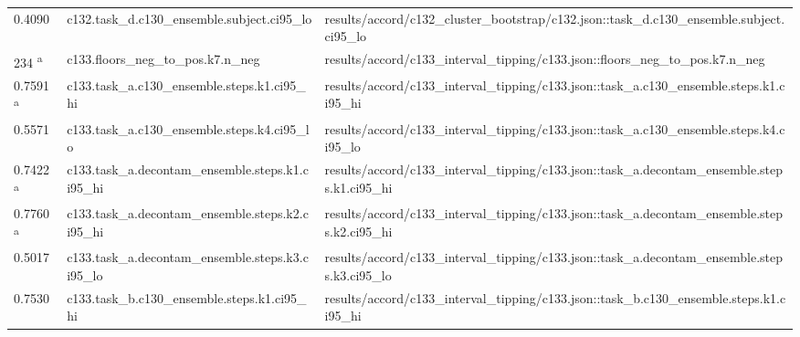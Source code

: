 \begin{longtable}{@{}p{0.7in}p{1.9in}p{2.6in}@{}}
0.4090 & c132.\allowbreak{}task\_d.\allowbreak{}c130\_ensemble.\allowbreak{}subject.\allowbreak{}ci95\_lo & results/\allowbreak{}accord/\allowbreak{}c132\_cluster\_bootstrap/\allowbreak{}c132.\allowbreak{}json::task\_d.\allowbreak{}c130\_ensemble.\allowbreak{}subject.\allowbreak{}ci95\_lo\\
234 \textsuperscript{a} & c133.\allowbreak{}floors\_neg\_to\_pos.\allowbreak{}k7.\allowbreak{}n\_neg & results/\allowbreak{}accord/\allowbreak{}c133\_interval\_tipping/\allowbreak{}c133.\allowbreak{}json::floors\_neg\_to\_pos.\allowbreak{}k7.\allowbreak{}n\_neg\\
0.7591 \textsuperscript{a} & c133.\allowbreak{}task\_a.\allowbreak{}c130\_ensemble.\allowbreak{}steps.\allowbreak{}k1.\allowbreak{}ci95\_hi & results/\allowbreak{}accord/\allowbreak{}c133\_interval\_tipping/\allowbreak{}c133.\allowbreak{}json::task\_a.\allowbreak{}c130\_ensemble.\allowbreak{}steps.\allowbreak{}k1.\allowbreak{}ci95\_hi\\
0.5571 & c133.\allowbreak{}task\_a.\allowbreak{}c130\_ensemble.\allowbreak{}steps.\allowbreak{}k4.\allowbreak{}ci95\_lo & results/\allowbreak{}accord/\allowbreak{}c133\_interval\_tipping/\allowbreak{}c133.\allowbreak{}json::task\_a.\allowbreak{}c130\_ensemble.\allowbreak{}steps.\allowbreak{}k4.\allowbreak{}ci95\_lo\\
0.7422 \textsuperscript{a} & c133.\allowbreak{}task\_a.\allowbreak{}decontam\_ensemble.\allowbreak{}steps.\allowbreak{}k1.\allowbreak{}ci95\_hi & results/\allowbreak{}accord/\allowbreak{}c133\_interval\_tipping/\allowbreak{}c133.\allowbreak{}json::task\_a.\allowbreak{}decontam\_ensemble.\allowbreak{}steps.\allowbreak{}k1.\allowbreak{}ci95\_hi\\
0.7760 \textsuperscript{a} & c133.\allowbreak{}task\_a.\allowbreak{}decontam\_ensemble.\allowbreak{}steps.\allowbreak{}k2.\allowbreak{}ci95\_hi & results/\allowbreak{}accord/\allowbreak{}c133\_interval\_tipping/\allowbreak{}c133.\allowbreak{}json::task\_a.\allowbreak{}decontam\_ensemble.\allowbreak{}steps.\allowbreak{}k2.\allowbreak{}ci95\_hi\\
0.5017 & c133.\allowbreak{}task\_a.\allowbreak{}decontam\_ensemble.\allowbreak{}steps.\allowbreak{}k3.\allowbreak{}ci95\_lo & results/\allowbreak{}accord/\allowbreak{}c133\_interval\_tipping/\allowbreak{}c133.\allowbreak{}json::task\_a.\allowbreak{}decontam\_ensemble.\allowbreak{}steps.\allowbreak{}k3.\allowbreak{}ci95\_lo\\
0.7530 & c133.\allowbreak{}task\_b.\allowbreak{}c130\_ensemble.\allowbreak{}steps.\allowbreak{}k1.\allowbreak{}ci95\_hi & results/\allowbreak{}accord/\allowbreak{}c133\_interval\_tipping/\allowbreak{}c133.\allowbreak{}json::task\_b.\allowbreak{}c130\_ensemble.\allowbreak{}steps.\allowbreak{}k1.\allowbreak{}ci95\_hi\\

\end{longtable}
